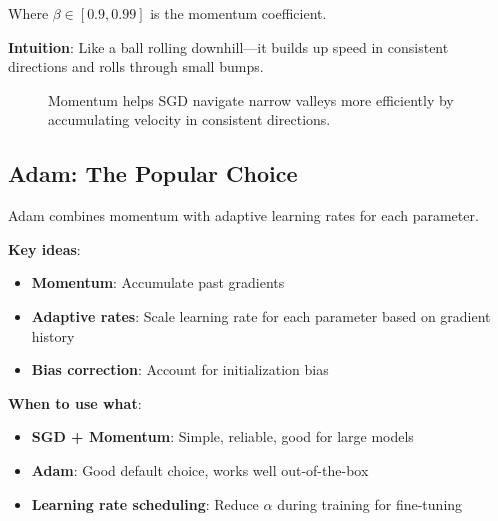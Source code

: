 \documentclass[11pt]{article}
\begin{document}
Where $\beta \in [0.9, 0.99]$ is the momentum coefficient.

\textbf{Intuition}: Like a ball rolling downhill—it builds up speed in consistent directions and rolls through small bumps.

\begin{figure}[h!]
\centering
{}
\caption{Momentum helps SGD navigate narrow valleys more efficiently by accumulating velocity in consistent directions.}
\label{fig:momentum}
\end{figure}

\subsection{Adam: The Popular Choice}
Adam combines momentum with adaptive learning rates for each parameter.

\textbf{Key ideas}:
\begin{itemize}
\item \textbf{Momentum}: Accumulate past gradients
\item \textbf{Adaptive rates}: Scale learning rate for each parameter based on gradient history
\item \textbf{Bias correction}: Account for initialization bias
\end{itemize}

\textbf{When to use what}:
\begin{itemize}
\item \textbf{SGD + Momentum}: Simple, reliable, good for large models
\item \textbf{Adam}: Good default choice, works well out-of-the-box
\item \textbf{Learning rate scheduling}: Reduce $\alpha$ during training for fine-tuning
\end{itemize}
\end{document}
